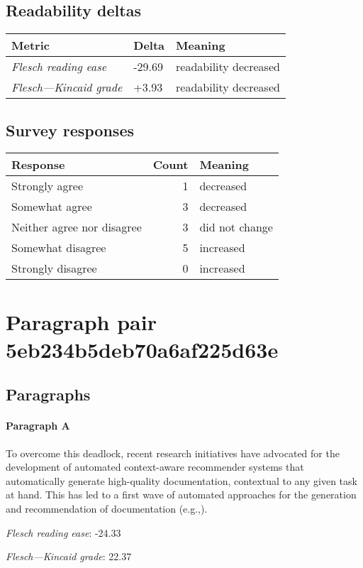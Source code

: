 \subsection{Readability deltas}

\begin{tabular}{lll}
\toprule
               \textbf{Metric} & \textbf{Delta} &       \textbf{Meaning} \\
\midrule
    \emph{Flesch reading ease} &         -29.69 &  readability decreased \\
 \emph{Flesch---Kincaid grade} &          +3.93 &  readability decreased \\
\bottomrule
\end{tabular}

\subsection{Survey responses}
\begin{tabular}{lrl}
\toprule
          \textbf{Response} &  \textbf{Count} & \textbf{Meaning} \\
\midrule
             Strongly agree &               1 &        decreased \\
             Somewhat agree &               3 &        decreased \\
 Neither agree nor disagree &               3 &   did not change \\
          Somewhat disagree &               5 &        increased \\
          Strongly disagree &               0 &        increased \\
\bottomrule
\end{tabular}

\section{Paragraph pair 5eb234b5deb70a6af225d63e}
\subsection{Paragraphs}
\paragraph{Paragraph A}
To overcome this deadlock, recent research initiatives have advocated for the development of automated context-aware recommender systems that automatically generate high-quality documentation, contextual to any given task at hand. This has led to a first wave of automated approaches for the generation and recommendation of documentation (e.g.,).\par\medskip
\emph{Flesch reading ease}: -24.33\par
\emph{Flesch---Kincaid grade}: 22.37

